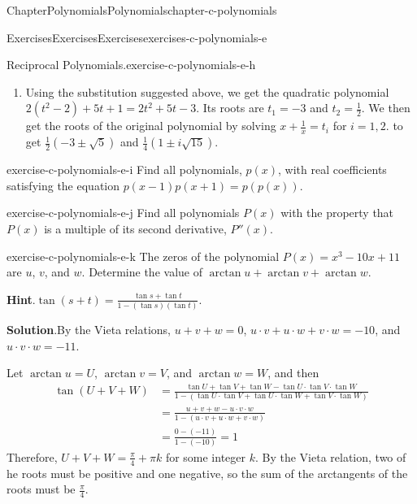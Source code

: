 \documentclass[oneside,10pt,]{book}
\newcommand{\blocktitlefont}{\relax}
\numberwithin{equation}{section}
\begin{document}
\begin{chapterptx}{Chapter}{Polynomials}{}{Polynomials}{}{}{chapter-c-polynomials}
\begin{exercises-section}{Exercises}{Exercises}{}{Exercises}{}{}{exercises-c-polynomials-e}
\begin{divisionexercise}{7}{Reciprocal Polynomials.}{}{exercise-c-polynomials-e-h}
\begin{enumerate}[label=(\alph*)]
\begin{equation*}
\end{equation*}
%
\item{}Using the substitution suggested above, we get the quadratic polynomial \(2 (t^2-2) + 5 t + 1 = 2t^2 +5t-3\).  Its roots are \(t_1=-3\) and \(t_2=\frac{1}{2}\). We then get the roots of the original polynomial by solving \(x+\frac{1}{x} =t_i\) for \(i = 1, 2\). to get \(\frac{1}{2} \left(-3 \pm \sqrt{5}\right)\) and \(\frac{1}{4} \left(1 \pm i \sqrt{15}\right)\).%
\end{enumerate}
%
\end{divisionexercise}%
\begin{divisionexercise}{8}{}{}{exercise-c-polynomials-e-i}%
Find all polynomials, \(p(x)\), with real coefficients satisfying the equation \(p(x-1)p(x+1) = p(p(x))\).%
\end{divisionexercise}%
\begin{divisionexercise}{9}{}{}{exercise-c-polynomials-e-j}%
Find all polynomials \(P(x)\) with the property that \(P(x)\) is a multiple of its second derivative, \(P''(x)\).%
\end{divisionexercise}%
\begin{divisionexercise}{10}{}{}{exercise-c-polynomials-e-k}%
The zeros of the polynomial \(P(x) = x^3 - 10x + 11\) are \(u\), \(v\), and \(w\). Determine the value of \(\arctan  u + \arctan v + \arctan  w\).%
\par\smallskip%
\noindent\textbf{\blocktitlefont Hint}.\hypertarget{hint-c-polynomials-e-k-b}{}\quad{}\(\tan(s+t)=\frac{\tan  s + \tan  t }{1-(\tan  s )(\tan  t)}\).%
\par\smallskip%
\noindent\textbf{\blocktitlefont Solution}.\hypertarget{solution-c-polynomials-e-k-c}{}\quad{}By the Vieta relations, \(u+v+w=0\), \(u\cdot v + u \cdot w + v \cdot w = -10\), and \(u\cdot v\cdot w = -11\).%
\par
Let \(\arctan u = U\),  \(\arctan v = V\), and  \(\arctan w = W\), and then%
\begin{equation*}
\begin{split}
\tan(U+V+W) &= \frac{\tan U + \tan V +\tan W - \tan U \cdot \tan V \cdot \tan W}
{1 -(\tan U \cdot \tan V + \tan U \cdot \tan W + \tan V \cdot \tan W)}\\
&=\frac{u + v + w - u\cdot v\cdot w}{1-(u\cdot v + u \cdot w + v \cdot w)}\\
&= \frac{0-(-11)}{1-(-10)}=1
\end{split}
\end{equation*}
Therefore, \(U+V+W = \frac{\pi}{4} + \pi k\) for some integer \(k\).  By the Vieta relation, two of he roots must be positive and one negative, so the sum of the arctangents of the roots must be \(\frac{\pi}{4}\).%

\end{divisionexercise}
\end{exercises-section}
\end{chapterptx}
\end{document}
